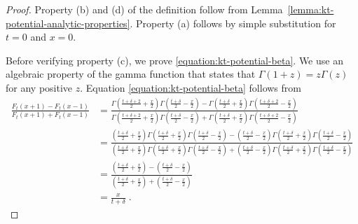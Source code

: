 \begin{proof}
Property (b) and (d) of the definition follow from
Lemma~\ref{lemma:kt-potential-analytic-properties}.
Property (a) follows by simple substitution for $t=0$ and $x=0$.

Before verifying property (c), we prove \eqref{equation:kt-potential-beta}. We
use an algebraic property of the gamma function that states that $\Gamma(1+z) =
z \Gamma(z)$ for any positive $z$. Equation \eqref{equation:kt-potential-beta}
follows from
\begin{align*}
\frac{F_t(x + 1) - F_t(x - 1)}{F_t(x + 1) + F_t(x - 1)}
& = \frac{\Gamma(\frac{t+\delta+2}{2} + \frac{x}{2}) \Gamma(\frac{t+\delta}{2} - \frac{x}{2}) - \Gamma(\frac{t+\delta}{2} + \frac{x}{2}) \Gamma(\frac{t+\delta+2}{2} - \frac{x}{2})}{\Gamma(\frac{t+\delta+2}{2} + \frac{x}{2}) \Gamma(\frac{t + \delta}{2} - \frac{x}{2}) + \Gamma(\frac{t + \delta}{2} + \frac{x}{2}) \Gamma(\frac{t+\delta+2}{2} - \frac{x}{2})} \\
& = \frac{(\frac{t+\delta}{2} + \frac{x}{2})\Gamma(\frac{t+\delta}{2} + \frac{x}{2}) \Gamma(\frac{t+\delta}{2} - \frac{x}{2}) - (\frac{t+\delta}{2} - \frac{x}{2})\Gamma(\frac{t+\delta}{2} + \frac{x}{2}) \Gamma(\frac{t+\delta}{2} - \frac{x}{2})}{(\frac{t+\delta}{2} + \frac{x}{2})\Gamma(\frac{t+\delta}{2} + \frac{x}{2}) \Gamma(\frac{t+\delta}{2} - \frac{x}{2}) + (\frac{t+\delta}{2} - \frac{x}{2})\Gamma(\frac{t+\delta}{2} + \frac{x}{2}) \Gamma(\frac{t+\delta}{2} - \frac{x}{2})} \\
& = \frac{(\frac{t+\delta}{2} + \frac{x}{2}) - (\frac{t+\delta}{2} - \frac{x}{2})}{(\frac{t+\delta}{2} + \frac{x}{2}) + (\frac{t+\delta}{2} - \frac{x}{2})} \\
& = \frac{x}{t+\delta} \; .
\end{align*}


\end{proof}

